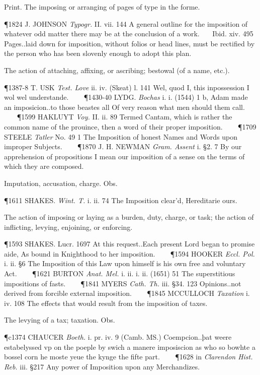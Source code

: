 \begin{description}[wide, labelwidth=!, labelindent=0pt]
\begin{myenumerate}
 Print. The imposing or arranging of pages of type in the forme.

\P 1824 J. JOHNSON  \textit{Typogr.} II. vii. 144 A general outline for the imposition of whatever odd matter there may be at the conclusion of a work.    Ibid. xiv. 495 Pages..laid down for imposition, without folios or head lines, must be rectified by the person who has been slovenly enough to adopt this plan.

 The action of attaching, affixing, or ascribing; bestowal (of a name, etc.).

\P 1387-8 T. USK  \textit{Test. Love} ii. iv. (Skeat) l. 141 Wel, quod I, this inpossession I wol wel understande.    
\P 1430-40 LYDG.  \textit{Bochas} i. i. (1544) 1 b, Adam made an imposicion..to those beastes all Of very reason what men should them call.    
\P 1599 HAKLUYT  \textit{Voy.} II. ii. 89 Termed Cantam, which is rather the common name of the prouince, then a word of their proper imposition.    
\P 1709 STEELE  \textit{Tatler} No. 49 1 The Imposition of honest Names and Words upon improper Subjects.    
\P 1870 J. H. NEWMAN  \textit{Gram. Assent} i. §2. 7 By our apprehension of propositions I mean our imposition of a sense on the terms of which they are composed.

 Imputation, accusation, charge. Obs.

\P 1611 SHAKES.  \textit{Wint. T.} i. ii. 74 The Imposition clear'd, Hereditarie ours.

 The action of imposing or laying as a burden, duty, charge, or task; the action of inflicting, levying, enjoining, or enforcing.

\P 1593 SHAKES. Lucr. 1697 At this  request..Each present Lord began to promise aide, As bound in Knighthood to her imposition.    
\P 1594 HOOKER  \textit{Eccl. Pol.} i. ii. §6 The Imposition of this Law upon himself is his own free and voluntary Act.    
\P 1621 BURTON  \textit{Anat. Mel.} i. ii. i. ii. (1651) 51 The superstitious impositions of fasts.    
\P 1841 MYERS  \textit{Cath. Th.} iii. §34. 123 Opinions..not derived from forcible external imposition.    
\P 1845 MCCULLOCH  \textit{Taxation} i. iv. 108 The effects that would result from the imposition of taxes.

 The levying of a tax; taxation. Obs.

\P c1374 CHAUCER  \textit{Boeth.} i. pr. iv. 9 (Camb. MS.) Coempcion..þat weere estabelyssed vp on the poeple by swich a manere imposiscion as who so bowhte a bossel corn he moste yeue the kynge the fifte part.    
\P 1628 in  \textit{Clarendon Hist. Reb.} iii. §217 Any power of Imposition upon any Merchandizes.


\end{myenumerate}
\end{description}

